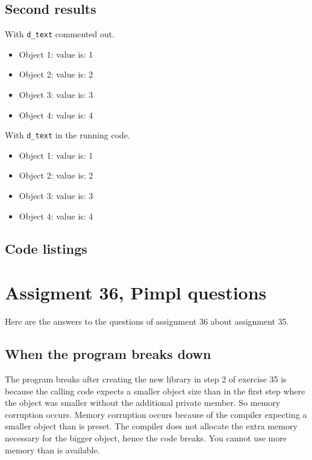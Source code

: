 \documentclass[11pt]{article}
\begin{document}
\subsection*{Second results}
With \texttt{d\_text} commented out.
\begin{itemize}
\item Object 1: value is: 1
\item Object 2: value is: 2
\item Object 3: value is: 3
\item Object 4: value is: 4
\end{itemize}

With \texttt{d\_text} in the running code.
\begin{itemize}
\item Object 1: value is: 1
\item Object 2: value is: 2
\item Object 3: value is: 3
\item Object 4: value is: 4
\end{itemize}

\subsection*{Code listings}




\section*{Assigment 36, Pimpl questions}
Here are the answers to the questions of assignment 36 about assignment 35.

\subsection*{When the program breaks down}
The program breaks after creating the new library in step 2 of exercise 35 is because the calling code expects a smaller object  size than in the first step where the object was smaller without the additional private member. So memory corruption occurs.
Memory corruption occurs because of the compiler expecting a smaller object than is preset.
The compiler does not allocate the extra memory necessary for the bigger object, hence the code breaks.
You cannot use more memory than is available.
\end{document}
